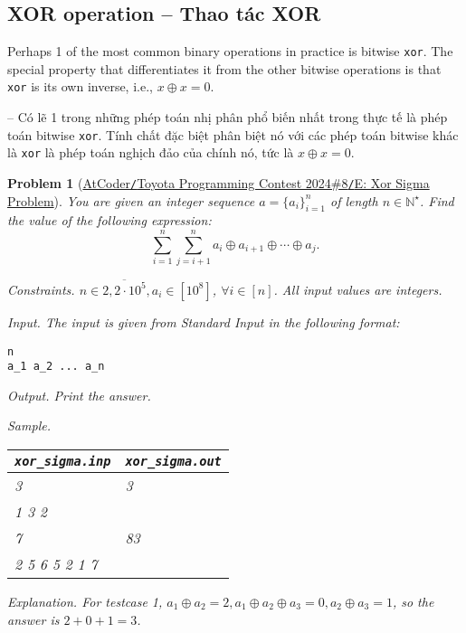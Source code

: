 \documentclass{article}
\newtheorem{problem}{Problem}
\begin{document}

\subsection{XOR operation -- Thao tác XOR}
Perhaps 1 of the most common binary operations in practice is bitwise {\tt xor}. The special property that differentiates it from the other bitwise operations is that {\tt xor} is its own inverse, i.e., $x\oplus x = 0$.

-- Có lẽ 1 trong những phép toán nhị phân phổ biến nhất trong thực tế là phép toán bitwise {\tt xor}. Tính chất đặc biệt phân biệt nó với các phép toán bitwise khác là {\tt xor} là phép toán nghịch đảo của chính nó, tức là $x\oplus x = 0$.

\begin{problem}[\href{https://atcoder.jp/contests/abc365/tasks/abc365_e}{AtCoder{\tt/}Toyota Programming Contest 2024\#8{\tt/}E: Xor Sigma Problem}]
    You are given an integer sequence $a = \{a_i\}_{i=1}^n$ of length $n\in\mathbb{N}^\star$. Find the value of the following expression:
    \begin{equation*}
        \sum_{i=1}^n\sum_{j = i + 1}^n a_i\oplus a_{i+1}\oplus\cdots\oplus a_j.
    \end{equation*}
    \item {\sf Constraints.} $n\in\overline{2,2\cdot10^5},a_i\in[10^8]$, $\forall i\in[n]$. All input values are integers.
    \item {\sf Input.} The input is given from Standard Input in the following format:
    \begin{verbatim}
n
a_1 a_2 ... a_n
    \end{verbatim}
    \item {\sf Output.} Print the answer.
    \item {\sf Sample.}
    \begin{table}[H]
        \centering
        \begin{tabular}{|l|l|}
            \hline
            \verb|xor_sigma.inp| & \verb|xor_sigma.out| \\
            \hline
            3 & 3 \\
            1 3 2 & \\
            \hline
            7 & 83 \\
            2 5 6 5 2 1 7 & \\
            \hline
        \end{tabular}
    \end{table}
    \item {\sf Explanation.} For testcase 1, $a_1\oplus a_2 = 2,a_1\oplus a_2\oplus a_3 = 0,a_2\oplus a_3 = 1$, so the answer is $2 + 0 + 1 = 3$.
\end{problem}
\end{document}
